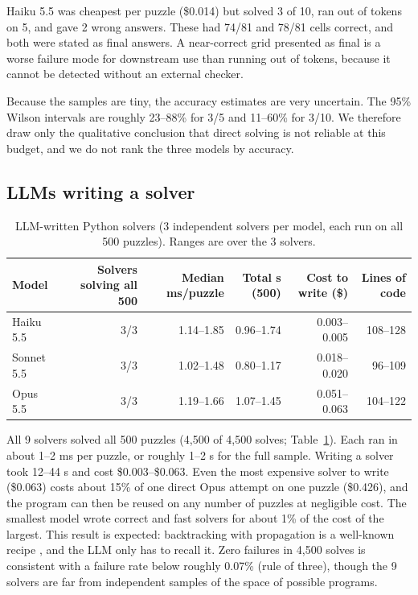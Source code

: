 \documentclass{article} %
\begin{document}
Haiku 5.5 was cheapest per puzzle (\$0.014) but solved 3 of 10, ran out of tokens on 5, and gave 2 wrong answers. These had 74/81 and 78/81 cells correct, and both were stated as final answers. A near-correct grid presented as final is a worse failure mode for downstream use than running out of tokens, because it cannot be detected without an external checker.

Because the samples are tiny, the accuracy estimates are very uncertain. The 95\% Wilson intervals are roughly 23--88\% for 3/5 and 11--60\% for 3/10. We therefore draw only the qualitative conclusion that direct solving is not reliable at this budget, and we do not rank the three models by accuracy.

\subsection{LLMs writing a solver}
\begin{table}[t]
\centering
\caption{LLM-written Python solvers (3 independent solvers per model, each run on all 500 puzzles). Ranges are over the 3 solvers.}
\label{tab:solvers}
\small
\begin{tabular}{lrrrrr}
\toprule
Model & Solvers solving all 500 & Median ms/puzzle & Total s (500) & Cost to write (\$) & Lines of code \\
\midrule
Haiku 5.5 & 3/3 & 1.14--1.85 & 0.96--1.74 & 0.003--0.005 & 108--128 \\
Sonnet 5.5 & 3/3 & 1.02--1.48 & 0.80--1.17 & 0.018--0.020 & 96--109 \\
Opus 5.5 & 3/3 & 1.19--1.66 & 1.07--1.45 & 0.051--0.063 & 104--122 \\
\bottomrule
\end{tabular}
\end{table}

All 9 solvers solved all 500 puzzles (4,500 of 4,500 solves; Table~\ref{tab:solvers}). Each ran in about 1--2 ms per puzzle, or roughly 1--2 s for the full sample. Writing a solver took 12--44 s and cost \$0.003--\$0.063. Even the most expensive solver to write (\$0.063) costs about 15\% of one direct Opus attempt on one puzzle (\$0.426), and the program can then be reused on any number of puzzles at negligible cost. The smallest model wrote correct and fast solvers for about 1\% of the cost of the largest. This result is expected: backtracking with propagation is a well-known recipe \citep{norvig2006sudoku}, and the LLM only has to recall it. Zero failures in 4,500 solves is consistent with a failure rate below roughly 0.07\% (rule of three), though the 9 solvers are far from independent samples of the space of possible programs.
\end{document}
